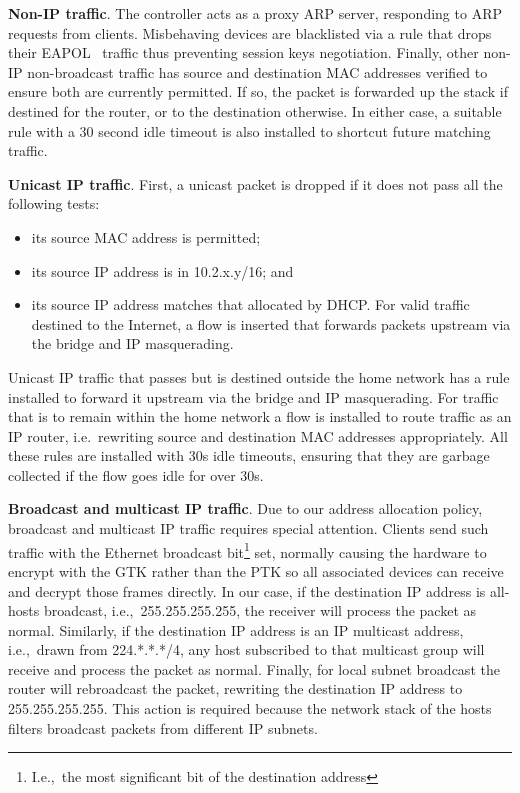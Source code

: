 \textbf{Non-IP traffic}.  The controller acts as a proxy ARP server, responding
to ARP requests from clients.  Misbehaving devices are blacklisted via a rule
that drops their EAPOL~ traffic thus preventing session keys
negotiation.
Finally, other non-IP non-broadcast traffic has source and destination MAC addresses verified
to ensure both are currently permitted.  If so, the packet is forwarded up the
stack if destined for the router, or to the destination otherwise.  In either
case, a suitable \of rule with a 30 second idle timeout is also installed to
shortcut future matching traffic.

\textbf{Unicast IP traffic}.  First, a unicast packet is dropped if it does not
pass all the following tests: 
\begin{itemize}
    \item its source MAC address is permitted; 
    \item its source IP address is in 10.2.x.y/16; and
    \item its source IP address matches that allocated by DHCP\@.  For valid
      traffic destined to the Internet, a flow is inserted that forwards packets
      upstream via the bridge and IP masquerading.  
\end{itemize} 
Unicast IP traffic that passes but is destined outside the home network has a
rule installed to forward it upstream via the bridge and IP masquerading.  For
traffic that is to remain within the home network a flow is installed to route
traffic as an IP router, i.e.~rewriting source and destination MAC addresses
appropriately.  All these rules are installed with 30s idle timeouts, ensuring
that they are garbage collected if the flow goes idle for over 30s.

\textbf{Broadcast and multicast IP traffic}.  Due to our address allocation
policy, broadcast and multicast IP traffic requires special attention.  Clients
send such traffic with the Ethernet broadcast bit\footnote{I.e.,~the most
  significant bit of the destination address} set, normally causing the hardware
to encrypt with the GTK rather than the PTK so all associated devices can
receive and decrypt those frames directly.  In our case, if the destination IP
address is all-hosts broadcast, i.e.,~255.255.255.255, the receiver will process
the packet as normal.  Similarly, if the destination IP address is an IP
multicast address, i.e.,~drawn from 224.*.*.*/4, any host subscribed to that
multicast group will receive and process the packet as normal. Finally, for
local subnet broadcast the router will rebroadcast the packet, rewriting the
destination IP address to 255.255.255.255. This action is required because the
network stack of the hosts filters broadcast packets from different IP subnets.

